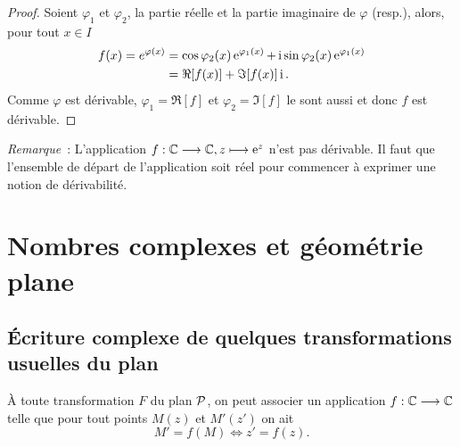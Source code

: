                                 \begin{proof}
                                  Soient \(\varphi_1\) et \(\varphi_2\), la partie réelle et la partie 
                                  imaginaire de \(\varphi\) (resp.), alors, pour tout \(x \in I\)
                                  \begin{align*}
                                    f(x) = e^{\varphi(x)}& = \cos \varphi_2(x) \e^{\varphi_1(x)}+ \ii \sin 
                                    \varphi_2(x)\e^{\varphi_1(x)}\\ 
                                                         & = \Re[f(x)] + \Im[f(x)]\ii.
                                  \end{align*}
                                  Comme \(\varphi\) est dérivable, \(\varphi_1 = \Re[f]\) et \(\varphi_2 = 
                                  \Im[f]\) le sont aussi et donc \(f\) est dérivable.
                                \end{proof}

                                \emph{Remarque}~: L'application \(\fonctionL{f}{\C}{\C}{z}{\e^z}\) n'est pas 
                                dérivable. Il faut que l'ensemble de départ de l'application soit réel pour 
                                commencer à exprimer une notion de dérivabilité.

                                \section{Nombres complexes et géométrie plane}
                                \label{sec:complexesetgeometrie}

                                \subsection{Écriture complexe de quelques transformations usuelles du plan}
                                \label{subsec:ecriturecomplexeettransformations}

                                À toute transformation \(F\) du plan \(\P\), on peut associer un application 
                                \(\fonctionR{f}{\C}{\C}\) telle que pour tout points \(M(z)\) et \(M'(z')\) on 
                                ait
                                \begin{equation}
                                  M' = f(M) \iff z' = f(z).
                                \end{equation}

